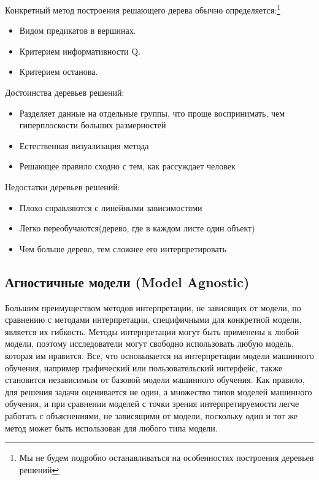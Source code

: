 \documentclass[12pt]{article}
\begin{document}
\noindent
Конкретный метод построения решающего дерева обычно определяется:\footnote{Мы не будем подробно останавливаться на особенностях построения деревьев решений}
\begin{itemize}
    \item Видом предикатов в вершинах.
    \item Критерием информативности Q.
    \item Критерием останова.
\end{itemize}

\newpage
\noindent
Достоинства деревьев решений:
\begin{itemize}
    \item Разделяет данные на отдельные группы, что проще воспринимать, 
    чем гиперплоскости больших размерностей 
    \item Естественная визуализация метода
    \item Решающее правило сходно с тем, как рассуждает человек
\end{itemize}

\noindent
Недостатки деревьев решений:
\begin{itemize}
    \item Плохо справляются с линейными зависимостями
    \item Легко переобучаются(дерево, где в каждом листе один объект)
    \item Чем больше дерево, тем сложнее его интерпретировать 
\end{itemize}




\subsection{Агностичные модели (Model Agnostic)}
Большим преимуществом методов интерпретации, не зависящих от модели,
по сравнению с методами интерпретации, специфичными для конкретной модели, 
является их гибкость. Методы интерпретации могут быть 
применены к любой модели, поэтому исследователи могут свободно использовать 
любую модель, которая им нравится. Все, что основывается на интерпретации модели машинного обучения, 
например графический или пользовательский интерфейс, также становится независимым от базовой 
модели машинного обучения. Как правило, для решения задачи оценивается не один, а множество типов
моделей машинного обучения, и при сравнении моделей с точки зрения интерпретируемости легче работать
с объяснениями, не зависящими от модели, поскольку один и тот же метод может быть использован для любого
типа модели.
\end{document}
